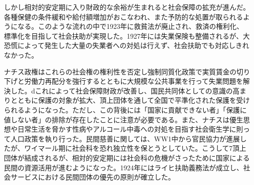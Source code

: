 \documentclass{jsarticle}
\begin{document}
しかし相対的安定期に入り財政的な余裕が生まれると社会保障の拡充が進んだ。各種保健の条件緩和や給付額増加がおこなわれ、また予防的な処置が取られるようになる。このような流れの中で1923年に救貧法が廃止され、救済の権利化、標準化を目指して社会扶助が実現した。1927年には失業保険も整備されるが、大恐慌によって発生した大量の失業者への対処は行えず、社会扶助でも対応しきれなかった。

ナチス政権はこれらの社会権の権利性を否定し強制同質化政策で実質賃金の切り下げと労働力再配分を強行するとともに大規模な公共事業を行って失業問題を解決した。dこれによって社会保障財政が改善し、国民共同体としての意識の高まりとともに保護の対象が拡大、頂上団体を通して全国で平準化された保護を受けられるようになった。ただし、この背後には「国家に貢献できない者」「保護に値しない者」の排除が存在したことに注意が必要である。また、ナチスは優生思想や日常生活を脅かす性病やアルコール中毒への対処を目指す社会衛生学に則って人口政策を執り行った。民間慈善に関しては、WW1中から官民協力が進展したが、ワイマール期に社会科を恐れ独立性を保とうとしていた。こうして7頂上団体が結成されるが、相対的安定期には社会科の危機がさったために国家による民間の資源活用が進むようになった。1924年にはライヒ扶助義務法が成立し、社会サービスにおける民間団体の優先の原則が確立した。
\end{document}
